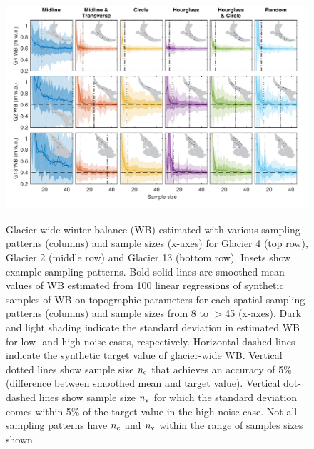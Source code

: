 \documentclass[twocolumn,letterpaper]{igs}
\begin{document}
\begin{figure}
	\centering
	\includegraphics[width =\textwidth]{SyntheticObsWB.pdf}\\
	\caption{Glacier-wide winter balance (WB) estimated with various sampling patterns (columns) and sample sizes (x-axes) for Glacier 4 (top row), Glacier 2 (middle row) and Glacier 13 (bottom row). Insets show example sampling patterns. Bold solid lines are smoothed mean values of WB estimated from 100 linear regressions of synthetic samples of WB on topographic parameters for each spatial sampling patterns (columns) and sample sizes from 8 to $>$45 (x-axes). Dark and light shading indicate the standard deviation in estimated WB for low- and high-noise cases, respectively. Horizontal dashed lines indicate the synthetic target value of glacier-wide WB. Vertical dotted lines show sample size $n_{\rm c}$ that achieves an accuracy of 5\% (difference between smoothed mean and target value). Vertical dot-dashed lines show sample size $n_{\rm v}$ for which the standard deviation comes within 5\% of the target value in the high-noise case. Not all sampling patterns have $n_{\rm c}$ and $n_{\rm v}$ within the range of samples sizes shown.}
	\label{fig:SyntheticObsWB}
\end{figure}
\end{document}
